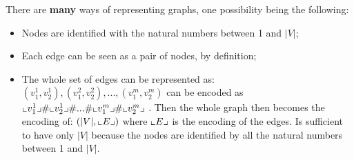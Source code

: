 \begin{solution}[C]
	There are \textbf{many} ways of representing graphs, one possibility being the following:
	\begin{itemize}
		\item Nodes are identified with the natural numbers between 1 and \(|V|\);
		\item Each edge can be seen as a pair of nodes, by definition;
		\item The whole set of edges can be represented as: \((v_1^1, v_2^1),(v_1^2, v_2^2), ..., (v_1^m, v_2^m)\) can be encoded as \(\llcorner  v_1^1 \lrcorner \# \llcorner  v_2^1 \lrcorner \# ... \# \llcorner  v_1^m \lrcorner \# \llcorner  v_2^m \lrcorner\) . Then the whole graph then becomes the encoding of: \((|V|, \llcorner  E \lrcorner)\) where \(\llcorner  E \lrcorner\) is the encoding of the edges. Is sufficient to have only \(|V|\) because the nodes are identified by all the natural numbers between 1 and \(|V|\).
	\end{itemize}
\end{solution}

